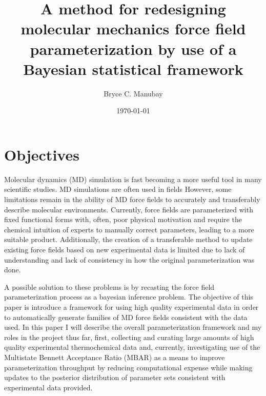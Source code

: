 \documentclass[rmp,nofootinbib,superscriptaddress,12pt,tightenlines,notitlepage]{revtex4-1}
\begin{document}

\title{A method for redesigning molecular mechanics force field parameterization by use of a Bayesian statistical framework}
\author{Bryce C. Manubay} 
\date{\today}

\maketitle
\section{Objectives}
Molecular dynamics (MD) simulation is fast becoming a more useful tool in many scientific studies. MD simulations are often used in fields However, some limitations remain in the ability of MD force fields to accurately and transferably describe molecular environments. Currently, force fields are parameterized with fixed functional forms with, often, poor physical motivation and require the chemical intuition of experts to manually correct parameters, leading to a more suitable product. Additionally, the creation of a transferable method to update existing force fields based on new experimental data is limited due to lack of understanding and lack of consistency in how the original parameterization was done.

A possible solution to these problems is by recasting the force field parameterization process as a bayesian inference problem. The objective of this paper is introduce a framework for using high quality experimental data in order to automatically generate families of MD force fields consistent with the data used. In this paper I will describe the overall parameterization framework and my roles in the project thus far, first, collecting and curating large amounts of high quality experimental thermochemical data and, currently, investigating use of the Multistate Bennett Acceptance Ratio (MBAR) as a means to improve parameterization throughput by reducing computational expense while making updates to the posterior distribution of parameter sets consistent with experimental data provided.
\end{document}
